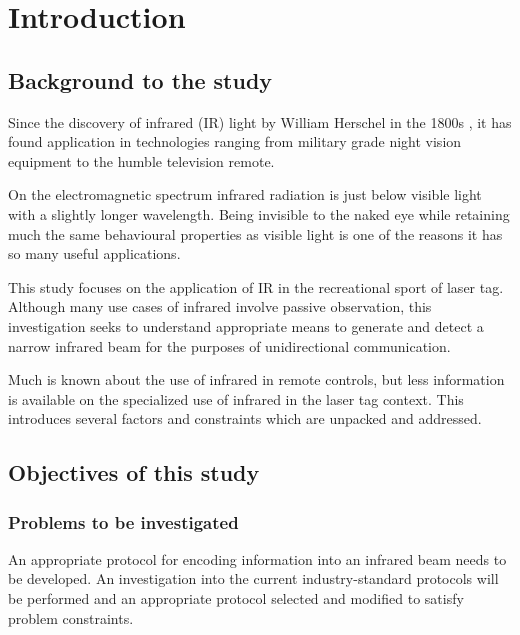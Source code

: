 \chapter{Introduction}

\section{Background to the study}
Since the discovery of infrared (IR) light by William Herschel in the 1800s \cite{Rowan-Robinson2013}, it has found application in technologies ranging from military grade night vision equipment to the humble television remote.

On the electromagnetic spectrum infrared radiation is just below visible light with a slightly longer wavelength. Being invisible to the naked eye while retaining much the same behavioural properties as visible light is one of the reasons it has so many useful applications.

This study focuses on the application of IR in the recreational sport of laser tag. Although many use cases of infrared involve passive observation, this investigation seeks to understand appropriate means to generate and detect a narrow infrared beam for the purposes of unidirectional communication.

Much is known about the use of infrared in remote controls, but less information is available on the specialized use of infrared in the laser tag context. This introduces several factors and constraints which are unpacked and addressed.



\section{Objectives of this study}
\subsection{Problems to be investigated}
An appropriate protocol for encoding information into an infrared beam needs to be developed. An investigation into the current industry-standard protocols will be performed and an appropriate protocol selected and modified to satisfy problem constraints.

